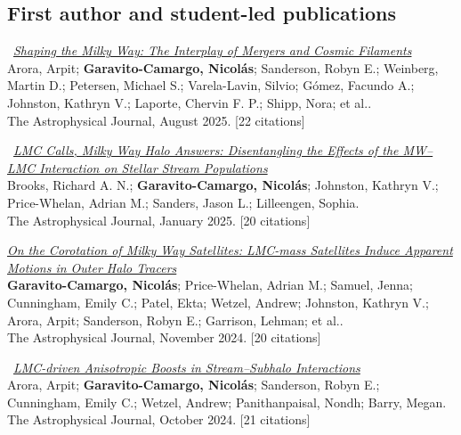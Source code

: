 \documentclass[14pt]{article}
\begin{document}
\subsection*{First author and student-led publications}

\begin{etaremune}
\item \dag\ \textit{\href{https://ui.adsabs.harvard.edu/abs/2025ApJ...988..190A/abstract}{Shaping the Milky Way: The Interplay of Mergers and Cosmic Filaments}}\\
  {\small \color{darkgray} Arora, Arpit; \textbf{Garavito-Camargo, Nicolás}; Sanderson, Robyn E.; Weinberg, Martin D.; Petersen, Michael S.; Varela-Lavin, Silvio; Gómez, Facundo A.; Johnston, Kathryn V.; Laporte, Chervin F. P.; Shipp, Nora; et al..\\
  The Astrophysical Journal, August 2025. [22 citations]}

\item \dag\ \textit{\href{https://ui.adsabs.harvard.edu/abs/2025ApJ...978...79B/abstract}{LMC Calls, Milky Way Halo Answers: Disentangling the Effects of the MW--LMC Interaction on Stellar Stream Populations}}\\
  {\small \color{darkgray} Brooks, Richard A. N.; \textbf{Garavito-Camargo, Nicolás}; Johnston, Kathryn V.; Price-Whelan, Adrian M.; Sanders, Jason L.; Lilleengen, Sophia.\\
  The Astrophysical Journal, January 2025. [20 citations]}

\item \textit{\href{https://ui.adsabs.harvard.edu/abs/2024ApJ...975..100G/abstract}{On the Corotation of Milky Way Satellites: LMC-mass Satellites Induce Apparent Motions in Outer Halo Tracers}}\\
  {\small \color{darkgray} \textbf{Garavito-Camargo, Nicolás}; Price-Whelan, Adrian M.; Samuel, Jenna; Cunningham, Emily C.; Patel, Ekta; Wetzel, Andrew; Johnston, Kathryn V.; Arora, Arpit; Sanderson, Robyn E.; Garrison, Lehman; et al..\\
  The Astrophysical Journal, November 2024. [20 citations]}

\item \dag\ \textit{\href{https://ui.adsabs.harvard.edu/abs/2024ApJ...974..286A/abstract}{LMC-driven Anisotropic Boosts in Stream--Subhalo Interactions}}\\
  {\small \color{darkgray} Arora, Arpit; \textbf{Garavito-Camargo, Nicolás}; Sanderson, Robyn E.; Cunningham, Emily C.; Wetzel, Andrew; Panithanpaisal, Nondh; Barry, Megan.\\
  The Astrophysical Journal, October 2024. [21 citations]}


\end{etaremune}
\end{document}
